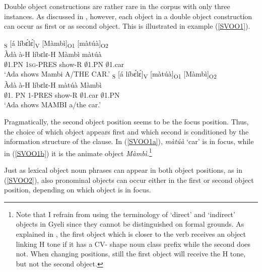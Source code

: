 Double object constructions are rather rare in the corpus with only three instances. As discussed in , however, each object in a double object construction can occur as first or as second object. This is illustrated in example (\ref{SVOO1}).

\begin{exe}
\ex\label{SVOO1}
\begin{xlist}
\ex\label{SVOO1a}
  \glll  [Àdà]\textsubscript{S} [á líbɛ́lɛ́]\textsubscript{V} [Màmbì]\textsubscript{O1} [màtúà]\textsubscript{O2} \\
         Àdà à-H líbɛlɛ-H Màmbì màtúà \\
        $\emptyset$1.PN 1\textsc{sg}-PRES show-R $\emptyset$1.PN $\emptyset$1.car   \\ 
    \trans `Ada shows Mambi A/THE CAR.'
\ex\label{SVOO1b}
  \glll  [Àdà]\textsubscript{S} [á líbɛ́lɛ́]\textsubscript{V} [màtúà]\textsubscript{O1} [Màmbì]\textsubscript{O2} \\
         Àdà à-H líbɛlɛ-H màtúà Màmbì  \\
       $\emptyset$1. PN 1-PRES show-R $\emptyset$1.car $\emptyset$1.PN    \\ 
    \trans `Ada shows MAMBI a/the car.'
\end{xlist}
\end{exe}

\noindent Pragmatically, the second object position seems to be the focus position. Thus, the choice of which object appears first and which second is conditioned by the information structure of the clause. In (\ref{SVOO1a}), {\itshape màtúà} `car' is in focus, while in (\ref{SVOO1b}) it is the animate object {\itshape Màmbì}.\footnote{Note that I refrain from using the terminology of `direct' and `indirect' objects in Gyeli since they cannot be distinguished on formal grounds. As explained in , the first object which is closer to the verb receives an object linking H tone if it has a CV- shape noun class prefix while the second does not. When changing positions, still the first object will receive the H tone, but not the second object.}

Just as lexical object noun phrases can appear in both object positions, as in (\ref{SVOO2}), also pronominal objects can occur either in the first or second object position, depending on which object is in focus.  

